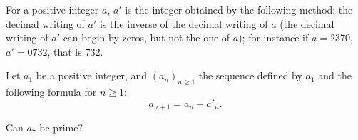 For a positive integer $a$,  $a'$ is the integer obtained by the following method: the decimal writing of $a'$ is the inverse of the decimal writing of $a$ (the decimal writing of $a'$ can begin by zeros, but not the one of $a$); for instance if $a=2370$,  $a'=0732$,  that is $732$.

Let $a_{1}$ be a positive integer, and $(a_{n})_{n \geq 1}$ the sequence defined by $a_{1}$ and the following formula for $n \geq 1$:\[a_{n+1}=a_{n}+a'_{n}. \]

Can $a_{7}$ be prime?